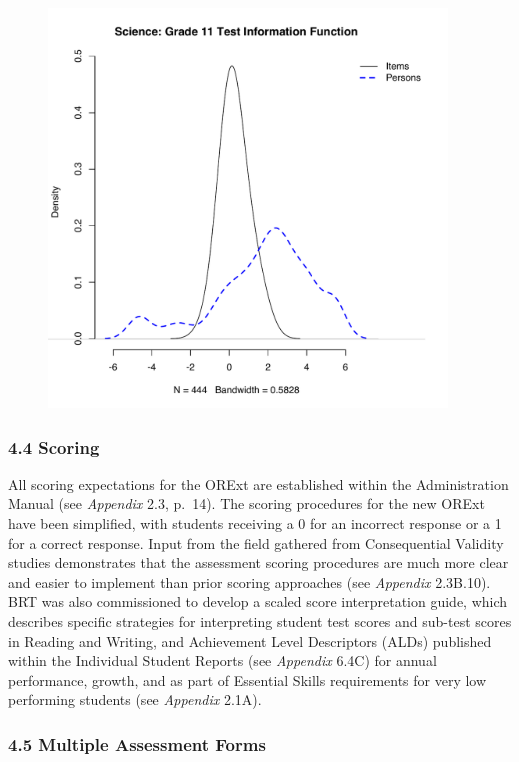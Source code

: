 \documentclass[]{article}
\begin{document}
\begin{figure}
\centering
\includegraphics[height=4.16667in]{ipdens/science11ipdens.pdf}
\caption{}
\end{figure}

\subsubsection{4.4 Scoring}\label{scoring}

All scoring expectations for the ORExt are established within the
Administration Manual (see \emph{Appendix} 2.3, p.~14). The scoring
procedures for the new ORExt have been simplified, with students
receiving a 0 for an incorrect response or a 1 for a correct response.
Input from the field gathered from Consequential Validity studies
demonstrates that the assessment scoring procedures are much more clear
and easier to implement than prior scoring approaches (see
\emph{Appendix} 2.3B.10). BRT was also commissioned to develop a scaled
score interpretation guide, which describes specific strategies for
interpreting student test scores and sub-test scores in Reading and
Writing, and Achievement Level Descriptors (ALDs) published within the
Individual Student Reports (see \emph{Appendix} 6.4C) for annual
performance, growth, and as part of Essential Skills requirements for
very low performing students (see \emph{Appendix} 2.1A).

\subsubsection{4.5 Multiple Assessment
Forms}\label{multiple-assessment-forms}
\end{document}
